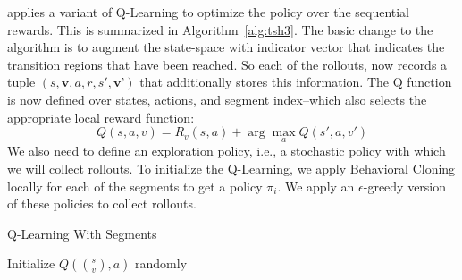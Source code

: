 \hirl applies a variant of Q-Learning to optimize the policy over the sequential rewards. This is summarized in Algorithm~\ref{alg:tsh3}. The basic change to the algorithm is to augment the state-space with indicator vector that indicates the transition regions that have been reached. So each of the rollouts, now records a tuple $(s,\textbf{v},a,r, s', \textbf{v'})$ that additionally stores this information. The Q function is now defined over states, actions, and segment index--which also selects the appropriate local reward function:
\[
Q(s,a,v) = R_v(s,a) + \arg \max_{a} Q(s',a, v')
\]
We also need to define an exploration policy, i.e., a stochastic policy with which we will collect rollouts. To initialize the Q-Learning, we apply Behavioral Cloning locally for each of the segments to get a policy $\pi_i$. We apply an $\epsilon$-greedy version of these policies to collect rollouts.

\begin{algorithmic}[t]
\small
\DontPrintSemicolon
\caption{Q-Learning With Segments \label{alg:tsh3}}

Initialize $Q(\binom{s}{v},a)$ randomly


\end{algorithmic}






